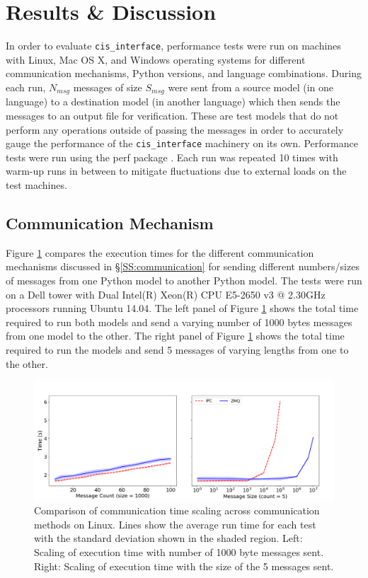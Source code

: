 \documentclass[journal]{IEEEtran}
\newcommand{\cis}{{\tt cis\_interface}{}}
\begin{document}
\section{Results \& Discussion}\label{S:results}
%
In order to evaluate {\cis}, performance tests were run on machines with Linux, Mac OS X, and Windows operating systems for different communication mechanisms, Python versions, and language combinations. During each run, $N_{msg}$ messages of size $S_{msg}$ were sent from a source model (in one language) to a destination model (in another language) which then sends the messages to an output file for verification. These are test models that do not perform any operations outside of passing the messages in order to accurately gauge the performance of the {\cis} machinery on its own. Performance tests were run using the perf package \citep{Stinner2018}. Each run was repeated 10 times with warm-up runs in between to mitigate fluctuations due to external loads on the test machines.

\subsection{Communication Mechanism}\label{SS:results_commtype}
%
Figure \ref{fig:commtype} compares the execution times for the different communication mechanisms discussed in \S\ref{SS:communication} for sending different numbers/sizes of messages from one Python model to another Python model. The tests were run on a Dell tower with Dual Intel(R) Xeon(R) CPU E5-2650 v3 @ 2.30GHz processors running Ubuntu 14.04. The left panel of Figure \ref{fig:commtype} shows the total time required to run both models and send a varying number of 1000 bytes messages from one model to the other. The right panel of Figure \ref{fig:commtype} shows the total time required to run the models and send 5 messages of varying lengths from one to the other. 
%
\ifinclfig
 	\begin{figure}[htbp]
	\begin{center}
	\includegraphics[width=\columnwidth,keepaspectratio]{./images/scaling_commtype.png}
	\caption{Comparison of communication time scaling across communication methods on Linux. Lines show the average run time for each test with the standard deviation shown in the shaded region. Left: Scaling of execution time with number of 1000 byte messages sent. Right: Scaling of execution time with the size of the 5 messages sent.}
	\label{fig:commtype}
	\end{center}
	\end{figure}
\fi
%
\end{document}
